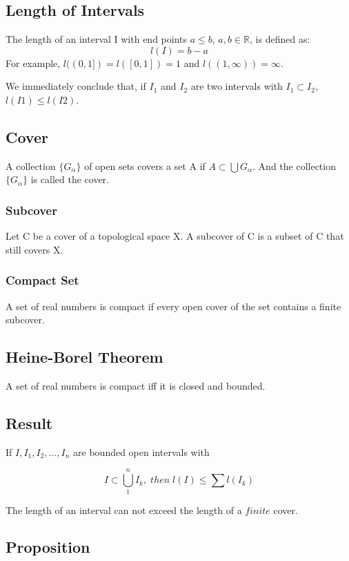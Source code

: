\documentclass{article}
\begin{document}
 \subsection{Length of Intervals}
 
 The length of an interval I with end points $a\leq b$, $a,b \in \mathbb{R}$, is defined as:
 $$l(I) = b-a$$
 For example, $l((0,1])=l([0,1])=1$ and $l((1,\infty))=\infty$.
 
 We immediately conclude that, if $I_1$ and $I_2$ are two intervals with $I_1 \subset I_2$, $l(I1) \leq l(I2)$.
 
 \subsection{Cover}
 
 A collection $\{G_{\alpha}\}$ of open sets covers a set A if $A \subset \bigcup G_{\alpha}$. And the collection $\{G_{\alpha}\}$ is called the cover.
 
 \subsubsection{Subcover}
 
 Let C be a cover of a topological space X. A subcover of C is a subset of C that still covers X.
 
 \subsubsection{Compact Set}
 
A set of real numbers is compact if every open cover of the set contains a finite subcover.

\subsection{Heine-Borel Theorem}
A set of real numbers is compact iff it is closed and bounded.

\subsection{Result}
If $I,I_1,I_2,\dots ,I_n$ are bounded open intervals with 

$$ I \subset \bigcup_{1}^{n}I_k ,\; then  \;l(I) \leq \sum l(I_k)$$

The length of an interval can not exceed the length of a $finite$ cover.

\subsection{Proposition}
\end{document}
